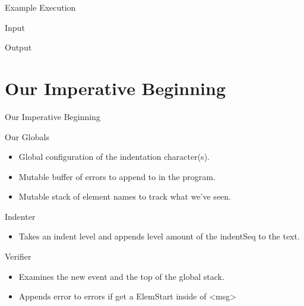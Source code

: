 \documentclass[professionalFonts,aspectratio=169]{beamer}
\begin{document}
\begin{frame}{Example Execution}

\begin{block}{Input}

\end{block}

\begin{block}{Output}

\end{block}

\end{frame}

\section{Our Imperative Beginning}

\begin{frame}{Our Imperative Beginning}
\end{frame}

\begin{frame}{Our Globals}

\begin{itemize}
\item Global configuration of the indentation character(s).
\item Mutable buffer of errors to append to in the program.
\item Mutable stack of element names to track what we've seen.
\end{itemize}



\end{frame}

\begin{frame}{Indenter}

\begin{itemize}
\item Takes an indent level and appends level amount of the indentSeq to the text.
\end{itemize}



\end{frame}

\begin{frame}{Verifier}

\begin{itemize}
\item Examines the new event and the top of the global stack.
\item Appends error to errors if get a ElemStart inside of <msg>
\end{itemize}



\end{frame}
\end{document}
